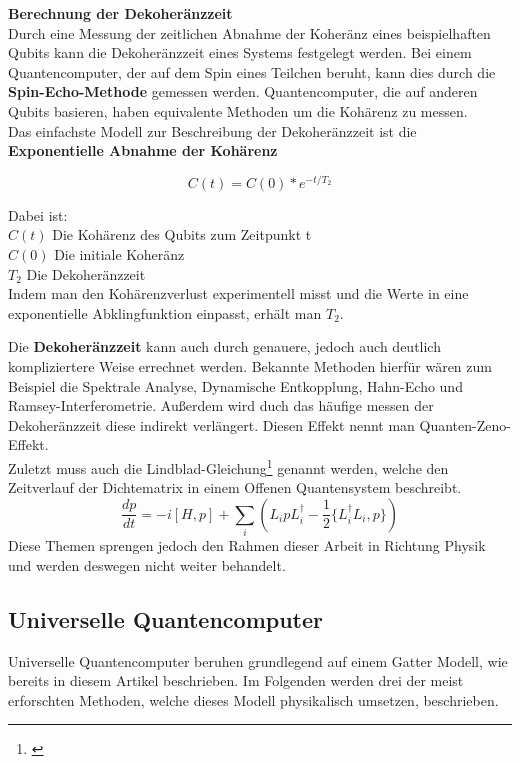 \textbf{Berechnung der Dekoheränzzeit}\\
Durch eine Messung der zeitlichen Abnahme der Koheränz eines beispielhaften Qubits kann die Dekoheränzzeit eines Systems festgelegt werden.
Bei einem Quantencomputer, der auf dem Spin eines Teilchen beruht, kann dies durch die \textbf{Spin-Echo-Methode} gemessen werden.
Quantencomputer, die auf anderen Qubits basieren, haben equivalente Methoden um die Kohärenz zu messen.\\

Das einfachste Modell zur Beschreibung der Dekoheränzzeit ist die \textbf{Exponentielle Abnahme der Kohärenz}

\begin{equation}
    C(t) = C(0)*e^{-t/T_2}
\end{equation}

Dabei ist:\\
$C(t)$ Die Kohärenz des Qubits zum Zeitpunkt t\\
$C(0)$ Die initiale Koheränz\\
$T_2$ Die Dekoheränzzeit\\

Indem man den Kohärenzverlust experimentell misst und die Werte in eine exponentielle Abklingfunktion einpasst, erhält man $T_2$.\\

\begin{tcolorbox}[title=Kommentar,
    title filled=false,
    colback=cyan!5!white,
    colframe=cyan!75!black]
    Die \textbf{Dekoheränzzeit} kann auch durch genauere, jedoch auch deutlich kompliziertere Weise errechnet werden.
    Bekannte Methoden hierfür wären zum Beispiel die Spektrale Analyse, Dynamische Entkopplung, Hahn-Echo und Ramsey-Interferometrie.
    Außerdem wird duch das häufige messen der Dekoheränzzeit diese indirekt verlängert. Diesen Effekt nennt man Quanten-Zeno-Effekt.\\
    Zuletzt muss auch die Lindblad-Gleichung\footnote{\cite{bacciagaluppi_role_2020}} genannt werden, welche den Zeitverlauf der Dichtematrix in einem Offenen Quantensystem beschreibt.
    \begin{equation}
        \frac{dp}{dt} = -i[H,p]+\sum_i(L_ipL^\dagger_i-\frac{1}{2}\{L^\dagger_i L_i,p\})
    \end{equation}
    Diese Themen sprengen jedoch den Rahmen dieser Arbeit in Richtung Physik und werden deswegen nicht weiter behandelt.
\end{tcolorbox}

\subsection{Universelle Quantencomputer}
\label{sub:universelle_quantencomputer}
Universelle Quantencomputer beruhen grundlegend auf einem Gatter Modell, wie bereits in diesem Artikel beschrieben. Im Folgenden werden drei der meist erforschten
Methoden, welche dieses Modell physikalisch umsetzen, beschrieben.\\

